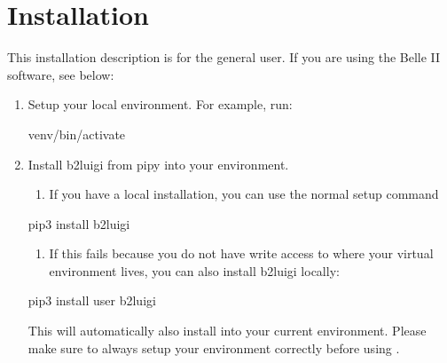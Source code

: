 \documentclass[letterpaper,10pt,english]{sphinxmanual}
\begin{document}
\section{Installation}
\label{\detokenize{usage/installation:installation}}\label{\detokenize{usage/installation:installation-label}}\label{\detokenize{usage/installation::doc}}
This installation description is for the general user. If you are using the Belle II software, see below:
\begin{enumerate}
%
\item {} 
Setup your local environment.
For example, run:

\begin{sphinxVerbatim}[commandchars=\\\{\}]
 venv/bin/activate
\end{sphinxVerbatim}

\item {} 
Install b2luigi from pipy into your environment.
\begin{enumerate}
%
\item {} 
If you have a local installation, you can use the normal setup command

\end{enumerate}

\begin{sphinxVerbatim}[commandchars=\\\{\}]
pip3 install b2luigi
\end{sphinxVerbatim}
\begin{enumerate}
%
\setcounter{enumii}{1}
\item {} 
If this fails because you do not have write access to where your virtual environment lives, you can also install
b2luigi locally:

\end{enumerate}

\begin{sphinxVerbatim}[commandchars=\\\{\}]
pip3 install \PYGZhy{}\PYGZhy{}user b2luigi
\end{sphinxVerbatim}

This will automatically also install  into your current environment.
Please make sure to always setup your environment correctly before using .

\end{enumerate}
\end{document}
